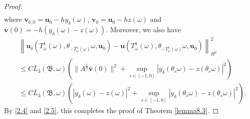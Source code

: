 \documentclass{elsarticle}
\theoremstyle{definition}
\numberwithin{equation}{section}
\begin{document}
\begin{proof}
\begin{align*}
\end{align*}
where $\textbf{v}_{\delta,0}=\textbf{u}_0-hy_\delta(\omega)$, $\textbf{v}_{0}=\textbf{u}_0-hz(\omega)$  and $\bar{\textbf{v}}(0)=-h(y_\delta(\omega)-z(\omega))$. Moreover, we also have
\begin{align*}
&\left \| \textbf{u}_\delta \! \left ( T_\omega^1 (\omega) ,\theta_{-T_\omega^1(\omega)}\omega,  \textbf{u}_{0}\right)
 - \textbf{u} \! \left ( T_\omega^1(\omega) ,\theta_{-T_\omega^1(\omega)}\omega, \textbf{u}_{0}\right) \right \|^2_{H^2}\nonumber\\
 &\leq C\bar{L}_3({\mathfrak B}, \omega)\left (\|A^\frac12\bar{\textbf{v}}(0)\|^2+\sup\limits_{s\in[-1,0]}|y_\delta(\theta_s\omega)-z(\theta_s\omega)|^2\right )\nonumber\\
 &\leq C\bar{L}_3({\mathfrak B}, \omega)\left (|y_\delta(\omega)-z(\omega)|^2+\sup\limits_{s\in[-1,0]}|y_\delta(\theta_s\omega)-z(\theta_s\omega)|^2\right ).
\end{align*}
By \eqref{2.4} and \eqref{2.5}, this completes the proof of Theorem \ref{lemma8.3}.
\end{proof}
\end{document}
